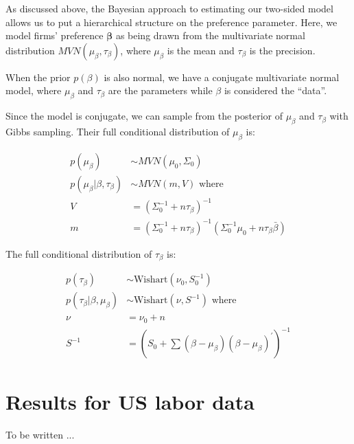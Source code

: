 As discussed above, the Bayesian approach to estimating our two-sided model
allows us to put a hierarchical structure on the preference parameter. Here, we
model firms' preference $\bm{\beta}$ as being drawn from the multivariate normal
distribution $MVN(\mu_{\beta}, \tau_{\beta})$, where $\mu_{\beta}$ is the mean
and $\tau_{\beta}$ is the precision.

When the prior $p(\beta)$ is also normal, we have a conjugate multivariate
normal model, where $\mu_{\beta}$ and $\tau_{\beta}$ are the parameters while
$\beta$ is considered the ``data''.

Since the model is conjugate, we can sample from the posterior of $\mu_{\beta}$
and $\tau_{\beta}$ with Gibbs sampling. Their full conditional distribution of
$\mu_{\beta}$ is:

\begin{align}
  p(\mu_{\beta}) &\sim MVN(\mu_0, \Sigma_0) \\
  p(\mu_{\beta} | \beta, \tau_{\beta}) &\sim MVN(m, V) \text{ where } \\
  V &= (\Sigma_0^{-1} + n \tau_{\beta})^{-1} \\
  m &= (\Sigma_0^{-1} + n \tau_{\beta})^{-1} (\Sigma_0^{-1}\mu_0 + n \tau_{\beta} \bar \beta)
\end{align}

The full conditional distribution of $\tau_{\beta}$ is:

\begin{align}
  p(\tau_{\beta}) &\sim \text{Wishart}(\nu_0, S_0^{-1}) \\
  p(\tau_{\beta} | \beta, \mu_{\beta}) &\sim \text{Wishart}(\nu, S^{-1}) \text{ where } \\
  \nu &= \nu_0 + n \\
  S^{-1} &= \left(S_0 + \sum (\beta - \mu_{\beta})(\beta - \mu_{\beta})^{\prime}\right)^{-1}
\end{align}

\section{Results for US labor data}

To be written ...
